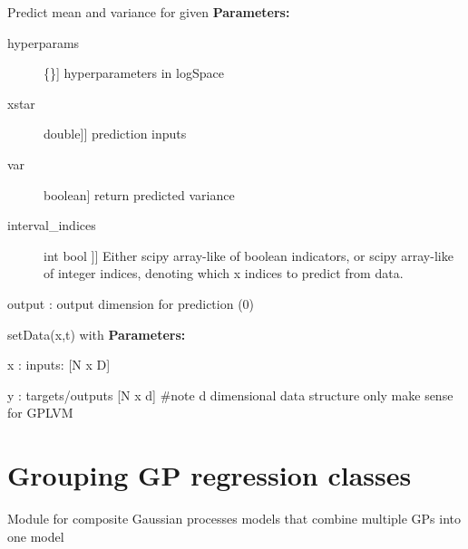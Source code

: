 \documentclass[letterpaper,10pt,english]{sphinxmanual}
\begin{document}
\begin{fulllineitems}
\begin{fulllineitems}
\label{gp:pygp.gp.gp_base.GP.predict}
Predict mean and variance for given \textbf{Parameters:}
\begin{description}
\item[{hyperparams}] \leavevmode{[}\{\}{]}
hyperparameters in logSpace

\item[{xstar}] \leavevmode{[}{[}double{]}{]}
prediction inputs

\item[{var}] \leavevmode{[}boolean{]}
return predicted variance

\item[{interval\_indices}] \leavevmode{[}{[} int \textbar{}\textbar{} bool {]}{]}
Either scipy array-like of boolean indicators, 
or scipy array-like of integer indices, denoting 
which x indices to predict from data.

\end{description}

output   : output dimension for prediction (0)

\end{fulllineitems}


\begin{fulllineitems}
\label{gp:pygp.gp.gp_base.GP.setData}
setData(x,t) with \textbf{Parameters:}

x : inputs: {[}N x D{]}

y : targets/outputs {[}N x d{]}
\#note d dimensional data structure only make sense for GPLVM

\end{fulllineitems}


\end{fulllineitems}

\label{gp:module-pygp.gp.composite}

\section{Grouping GP regression classes}
\label{gp:grouping-gp-regression-classes}
Module for composite Gaussian processes models that combine multiple GPs into one model
\end{document}
